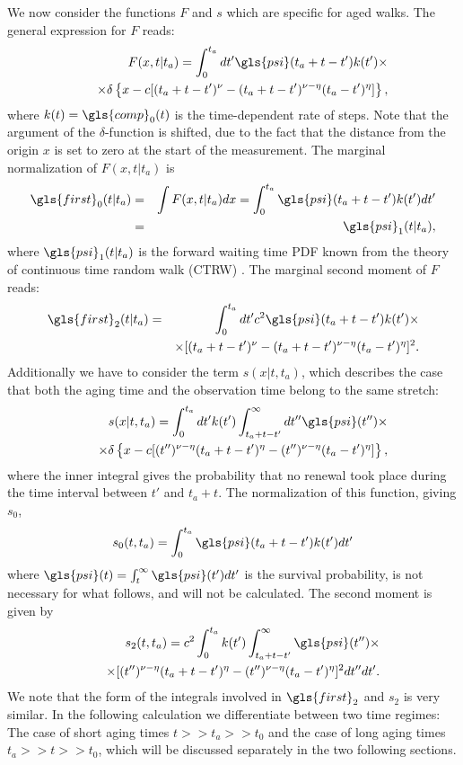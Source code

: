 We now consider the functions $F$ and $s$ which are specific for aged walks. The general expression for $F$ reads: 
\begin{eqnarray}
&& F(x,t|t_a)= \int_0^{t_a} dt'  \gls{psi}(t_a+t-t') k(t') \times \\
&& \;\; \times \delta \left\{x-c[(t_a+t-t')^\nu-(t_a+t-t')^{\nu-\eta} (t_a-t')^\eta]\right\} , \nonumber
\end{eqnarray}
where $k(t)=\gls{comp}_{0}(t)$ is the time-dependent rate of steps. Note that the argument of the $\delta$-function is shifted, 
due to the fact that the distance from the origin $x$ is set to zero at the start of the measurement.
The marginal normalization of $F(x,t|t_a)$ is
\begin{eqnarray}
\gls{first}_0(t|t_a) &=& \int F(x,t|t_a) dx =\int_0^{t_a} \gls{psi}(t_a+t-t') k(t') dt' \nonumber \\
 &=& \gls{psi}_1(t|t_a),
\end{eqnarray}
where $\gls{psi}_1(t|t_a)$ is the forward waiting time PDF known from the theory of continuous time random walk (CTRW) \cite{Sokolov_Klafter}. The marginal second moment of $F$ reads:
\begin{eqnarray}
\gls{first}_2(t|t_a) &=& \int_0^{t_a} dt' c^2 \gls{psi}(t_a+t-t') k(t') \times \label{eqn:F2} \\ 
&& \times [(t_a+t-t')^\nu-(t_a+t-t')^{\nu-\eta} (t_a-t')^\eta]^2 . \nonumber
\end{eqnarray}
Additionally we have to consider the term $s(x|t,t_a)$, which describes the case that both the aging time and the observation time belong to the same stretch:
\begin{eqnarray}
&& s(x|t,t_a) = \int_0^{t_a} dt' k(t') \int^{\infty}_{t_a+t-t'} dt'' \gls{psi}(t'') \times \\
&& \;\; \times \delta \left\{x-c[(t'')^{\nu-\eta}(t_a+t-t')^\eta-(t'')^{\nu-\eta}(t_a-t')^{\eta}]\right\} , \nonumber 
\end{eqnarray}
where the inner integral gives the probability that no renewal took place during the time interval between $t'$ and $t_a+t$. The normalization of this function, giving $s_0$, 
\begin{equation}
 s_0(t,t_a) = \int_0^{t_a} \gls{psi}(t_a+t-t') k(t') dt' 
\end{equation}
where $\gls{psi}(t) = \int_t^\infty \gls{psi}(t') dt'$ is the survival probability,
is not necessary for what follows, and will not be calculated. The second moment is given by
\begin{eqnarray}
&& s_2(t,t_a) =c^2 \int_0^{t_a}  k(t') \int^{\infty}_{t_a+t-t'}  \gls{psi}(t'') \times \label{eqn:s2}\\ 
&& \;\; \times [(t'')^{\nu-\eta}(t_a+t-t')^\eta-(t'')^{\nu-\eta}(t_a-t')^{\eta}]^2   dt'' dt'. \nonumber 
\end{eqnarray}
We note that the form of the integrals involved in $\gls{first}_2$ and $s_2$ is very similar. 
In the following calculation we differentiate between two time regimes: The case of short aging times $t>>t_a>> t_0$ and the case of long aging times $t_a>>t>>t_0$, 
which will be discussed separately in the two following sections. 

